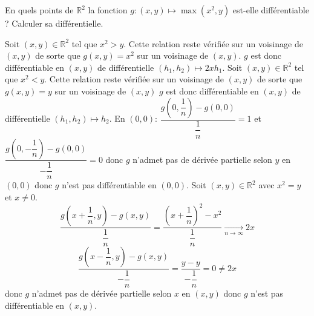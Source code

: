 \documentclass{fancybook}
\begin{document}
\begin{exercice}
En quels points de $\mathbb R^2$ la fonction $g:(x,y)\mapsto \max(x^2,y)$ est-elle différentiable ? Calculer sa différentielle.
\end{exercice}
Soit $(x,y)\in \mathbb R^2$ tel que $x^2>y$. Cette relation reste vérifiée sur un voisinage de $(x,y)$ de sorte que $g(x,y)=x^2$ sur un voisinage de $(x,y)$. $g$ est donc différentiable en $(x,y)$ de différentielle $(h_1,h_2)\mapsto 2xh_1$.\newline \newline
Soit $(x,y)\in \mathbb R^2$ tel que $x^2<y$. Cette relation reste vérifiée sur un voisinage de $(x,y)$ de sorte que $g(x,y)=y$ sur un voisinage de $(x,y)$
$g$ est donc différentiable en $(x,y)$ de différentielle $(h_1,h_2)\mapsto h_2$.\newline \newline
En $(0,0)$: $\displaystyle \dfrac{g(0,\dfrac 1n) - g(0,0)}{\dfrac 1n} = 1$ et $\displaystyle \dfrac{g(0,-\dfrac 1n) - g(0,0)}{-\dfrac 1n}=0$ donc $g$ n'admet pas de dérivée partielle selon $y$ en $(0,0)$ donc $g$ n'est pas différentiable en $(0,0)$. \newline \newline
Soit $(x,y)\in \mathbb R^2$ avec $x^2=y$ et $x\neq 0$. $$\displaystyle \dfrac{g(x+\dfrac 1n,y) - g(x,y)}{\dfrac 1n} = \dfrac{\left(x+\dfrac 1n \right)^2-x^2}{\dfrac 1n}\xrightarrow[n\to \infty]{} 2x$$
$$\displaystyle \dfrac{g(x-\dfrac 1n,y) - g(x,y)}{-\dfrac 1n} = \dfrac{y-y}{-\dfrac 1n}=0\neq 2x$$
donc $g$ n'admet pas de dérivée partielle selon $x$ en $(x,y)$ donc $g$ n'est pas différentiable en $(x,y)$.
\end{document}
